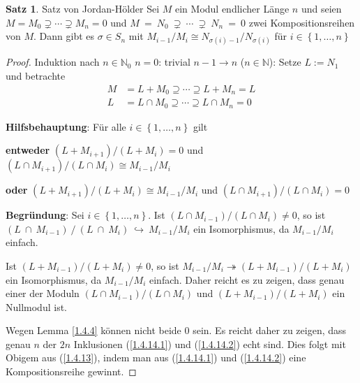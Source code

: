 \documentclass[
twoside=semi,
fontsize=12,
DIV=12, 
cleardoublepage=current,
leqno,
headings=optiontoheadandtoc, 
toc=idx
]{scrbook}
\newcommand{\N}{\mathbb{N}}
\newcommand{\set}[1]{\left\{ #1 \right\}}
\theoremstyle{definition}
\newtheorem{satz}[definition]{Satz}
\begin{document}
	\begin{satz}\label{1.4.14} Satz von Jordan-H\"older\newline
		Sei $M$ ein Modul endlicher L\"ange $n$ und seien $M = M_0 \supsetneq \cdots \supsetneq M_n = 0$ und $M~=~N_0~\supsetneq~\cdots~\supsetneq~N_n~=~0$ zwei Kompositionsreihen von $M$. Dann gibt es 
		$\sigma \in S_n$ mit $M_{i-1}/M_i \cong N_{\sigma(i)-1}/N_{\sigma(i)}$ f\"ur $i \in \set{1, \dots, n}$
		
		\begin{proof}
			Induktion nach $n \in \N_0$\newline
			$n = 0$: trivial\newline
			$n-1 \rightarrow n$ ($n \in \N$): Setze $L:=N_1$ und betrachte 
				\begin{align}
					M &= L + M_0 \supseteq \cdots \supseteq L + M_n = L \label{1.4.14.1}\tag{$*$}\\
					L &= L \cap M_0 \supseteq \cdots \supseteq L \cap M_n = 0 \label{1.4.14.2}\tag{$**$}
				\end{align}
			{\color{red}
			\noindent 
			\textbf{Hilfsbehauptung}: F\"ur alle $i \in \set{1, \dots, n}$ gilt 
			
			\textbf{entweder} $(L+M_{i+1})/(L+M_i) = 0$ und $(L\cap M_{i+1})/(L\cap M_i) \cong M_{i-1}/M_i$
			
			\textbf{oder} $(L+M_{i+1})/(L+M_i) \cong M_{i-1}/M_i$ und $(L\cap M_{i+1})/(L\cap M_i) = 0$
			
			\smallskip\noindent
			\textbf{Begr\"undung}: Sei $i \in \set{1, \dots, n}$. Ist $(L\cap M_{i-1})/(L\cap M_i) \neq 0$, so ist \linebreak $(L~\cap~M_{i-1})~/~(L~\cap~M_i)~\hookrightarrow~ M_{i-1}/M_i$
			ein Isomorphismus, da $M_{i-1}/M_i$ einfach.
			
			\noindent Ist $(L+M_{i-1})/(L+M_i) \neq 0$, so ist $M_{i-1}/M_i \twoheadrightarrow (L+M_{i-1})/(L+M_i)$ ein Isomorphismus, da $M_{i-1}/M_i$ einfach. Daher reicht es zu zeigen, dass genau einer der Moduln $(L\cap M_{i-1})/(L\cap M_i)$ und $(L+M_{i-1})/(L+M_i)$ ein Nullmodul ist.
			
			\noindent Wegen Lemma \ref{1.4.4} k\"onnen nicht beide $0$ sein. Es reicht daher zu zeigen, dass genau $n$ der $2n$ Inklusionen (\ref{1.4.14.1}) und (\ref{1.4.14.2}) echt sind. Dies folgt mit Obigem aus (\ref{1.4.13}), indem man aus (\ref{1.4.14.1}) und (\ref{1.4.14.2}) eine Kompositionsreihe gewinnt. }
			

\end{proof}
\end{satz}
\end{document}
